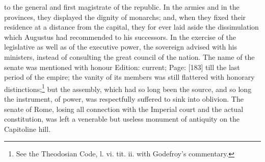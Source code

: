 to the general and first magistrate of the republic. In the armies and in the provinces, they displayed the dignity of monarchs; and, when they fixed their residence at a distance from the capital, they for ever laid aside the dissimulation which Augustus had recommended to his successors. In the exercise of the legislative as well as of the executive power, the sovereign advised with his ministers, instead of consulting the great council of the nation. The name of the senate was mentioned with honour Edition: current; Page: [183] till the last period of the empire; the vanity of its members was still flattered with honorary distinctions;\footnote{See the Theodosian Code, l. vi. tit. ii. with Godefroy\texthebrew{}’s commentary.} but the assembly, which had so long been the source, and so long the instrument, of power, was respectfully suffered to sink into oblivion. The senate of Rome, losing all connection with the Imperial court and the actual constitution, was left a venerable but useless monument of antiquity on the Capitoline hill.

